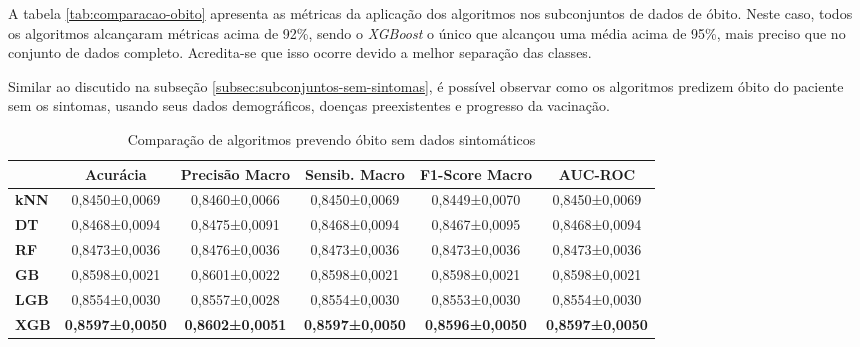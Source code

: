 A tabela \ref{tab:comparacao-obito} apresenta as métricas da aplicação dos algoritmos nos subconjuntos de dados de óbito.
Neste caso, todos os algoritmos alcançaram métricas acima de 92\%, sendo o \textit{XGBoost} o único que alcançou uma média acima de 95\%, mais preciso que no conjunto de dados completo. Acredita-se que isso ocorre devido a melhor separação das classes.

Similar ao discutido na subseção \ref{subsec:subconjuntos-sem-sintomas}, é possível observar como os algoritmos predizem óbito do paciente sem os sintomas, usando seus dados demográficos, doenças preexistentes e progresso da vacinação.

\begin{table}[H]
  \footnotesize
  \centering
  \begin{tabular}{l|c|c|c|c|c|}
    \cline{2-6}
    \textbf{}                          & \textbf{Acurácia}      & \textbf{Precisão Macro} & \textbf{Sensib. Macro} & \textbf{F1-Score Macro} & \textbf{AUC-ROC}       \\ \hline
    \multicolumn{1}{|l|}{\textbf{kNN}} & 0,8450±0,0069          & 0,8460±0,0066           & 0,8450±0,0069          & 0,8449±0,0070           & 0,8450±0,0069          \\ \hline
    \multicolumn{1}{|l|}{\textbf{DT}}  & 0,8468±0,0094          & 0,8475±0,0091           & 0,8468±0,0094          & 0,8467±0,0095           & 0,8468±0,0094          \\ \hline
    \multicolumn{1}{|l|}{\textbf{RF}}  & 0,8473±0,0036          & 0,8476±0,0036           & 0,8473±0,0036          & 0,8473±0,0036           & 0,8473±0,0036          \\ \hline
    \multicolumn{1}{|l|}{\textbf{GB}}  & 0,8598±0,0021          & 0,8601±0,0022           & 0,8598±0,0021          & 0,8598±0,0021           & 0,8598±0,0021          \\ \hline
    \multicolumn{1}{|l|}{\textbf{LGB}} & 0,8554±0,0030          & 0,8557±0,0028           & 0,8554±0,0030          & 0,8553±0,0030           & 0,8554±0,0030          \\ \hline
    \multicolumn{1}{|l|}{\textbf{XGB}} & \textbf{0,8597±0,0050} & \textbf{0,8602±0,0051}  & \textbf{0,8597±0,0050} & \textbf{0,8596±0,0050}  & \textbf{0,8597±0,0050} \\ \hline
    \end{tabular}
\caption{Comparação de algoritmos prevendo óbito sem dados sintomáticos}
\label{tab:comparacao-obito-sem-dados-sintomaticos}
\end{table}

